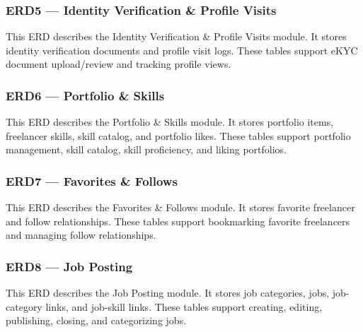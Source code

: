 
\subsubsection{ERD5 --- Identity Verification \& Profile Visits}

This ERD describes the Identity Verification \& Profile Visits module. It stores identity verification documents and profile visit logs. These tables support eKYC document upload/review and tracking profile views.


\subsubsection{ERD6 --- Portfolio \& Skills}

This ERD describes the Portfolio \& Skills module. It stores portfolio items, freelancer skills, skill catalog, and portfolio likes. These tables support portfolio management, skill catalog, skill proficiency, and liking portfolios.


\subsubsection{ERD7 --- Favorites \& Follows}

This ERD describes the Favorites \& Follows module. It stores favorite freelancer and follow relationships. These tables support bookmarking favorite freelancers and managing follow relationships.


\subsubsection{ERD8 --- Job Posting}

This ERD describes the Job Posting module. It stores job categories, jobs, job-category links, and job-skill links. These tables support creating, editing, publishing, closing, and categorizing jobs.


